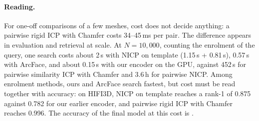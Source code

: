 \paragraph{Reading.}
For one-off comparisons of a few meshes, cost does not decide anything: a
pairwise rigid ICP with Chamfer costs 34--45\,ms per pair.
The difference appears in evaluation and retrieval at scale. At
$N=10{,}000$, counting the enrolment of the query, one search costs about
2\,s with NICP on template (1.15\,s + 0.81\,s), 0.57\,s with ArcFace, and
about 0.15\,s with our encoder on the GPU, against 452\,s for pairwise
similarity ICP with Chamfer and 3.6\,h for pairwise NICP.
Among enrolment methods, ours and ArcFace search fastest, but
cost must be read together with accuracy: on HIFI3D, NICP on template
reaches a rank-1 of 0.875 against 0.782 for our earlier encoder, and pairwise
rigid ICP with Chamfer reaches 0.996.
The accuracy of the final model at this cost is .
